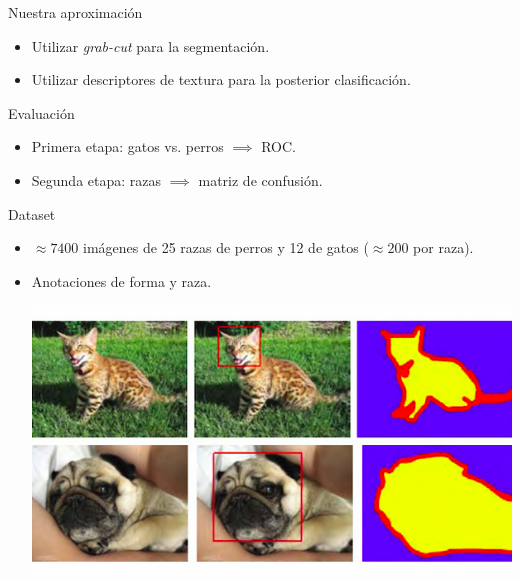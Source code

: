 \documentclass{beamer}
\begin{document}
\begin{frame}{Nuestra aproximación}
    \begin{itemize}
        \item Utilizar \emph{grab-cut} para la segmentación.
            \pause
        \item Utilizar descriptores de textura para la posterior
            clasificación.
    \end{itemize}
\end{frame}
\begin{frame}{Evaluación}
    \begin{itemize}
        \item Primera etapa: gatos vs. perros $\implies$ ROC.
            \pause
        \item Segunda etapa: razas $\implies$ matriz de confusión.
    \end{itemize}
\end{frame}
\begin{frame}{Dataset}
    \begin{itemize}
        \item $\approx 7400$ imágenes de 25 razas de perros y 12 de gatos
            ($\approx 200$ por raza).
        \item Anotaciones de forma y raza.
            \pause
            \begin{center}
                \includegraphics[scale=0.3]{imagen/catsanddogs_annotation}
            \end{center}
    \end{itemize}
\end{frame}
\end{document}
